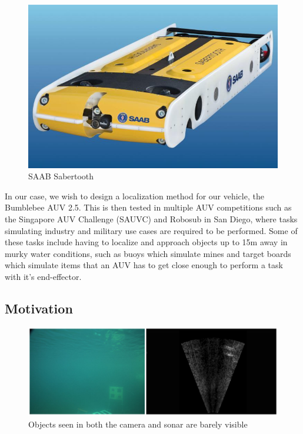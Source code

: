 \documentclass[15pt]{article}
\begin{document}
\begin{figure}[h!]
  \centering
  \includegraphics[scale=0.3]{Sabertooth}
  \captionsetup{justification=centering}
  \caption{SAAB Sabertooth}
\end{figure}

In our case, we wish to design a localization method for our vehicle, the Bumblebee AUV 2.5. This is then tested in multiple AUV competitions such as the Singapore AUV Challenge (SAUVC) and Robosub in San Diego, where tasks simulating industry and military use cases are required to be performed. Some of these tasks include having to localize and approach objects up to 15m away in murky water conditions, such as buoys which simulate mines and target boards which simulate items that an AUV has to get close enough to perform a task with it's end-effector.

\subsection{Motivation}

\begin{figure}[h!]
  \centering
  \includegraphics[scale=0.3]{pfsem1}
  \captionsetup{justification=centering}
  \caption{Objects seen in both the camera and sonar are barely visible}
\end{figure}
\end{document}
